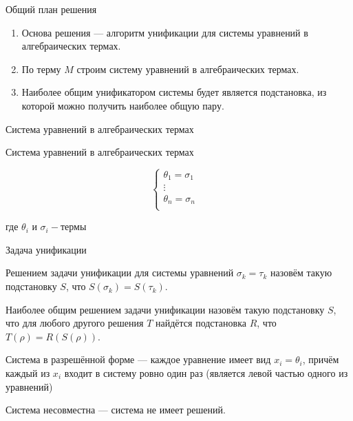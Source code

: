 \documentclass[aspectratio=169]{beamer}
\begin{document}
\begin{frame}{Общий план решения}
\begin{enumerate}
\item Основа решения --- алгоритм унификации для системы уравнений в алгебраических термах.
\item По терму $M$ строим систему уравнений в алгебраических термах.
\item Наиболее общим унификатором системы будет является подстановка, из которой можно получить наиболее общую пару.
\end{enumerate}
\end{frame}

\begin{frame}{Система уравнений в алгебраических термах}
	\begin{dfn}Система уравнений в алгебраических термах\end{dfn}
	$$
		\begin{cases}
			\theta_1=\sigma_1&\\
			\vdots&\\
			\theta_n=\sigma_n&\\
		\end{cases}
	$$\par где $\theta_i \text{ и } \sigma_i-\text{термы}$\par
\end{frame}

\begin{frame}{Задача унификации}

\begin{dfn}Решением задачи унификации для системы уравнений $\sigma_k = \tau_k$ назовём такую подстановку
$S$, что $S(\sigma_k) = S(\tau_k)$.
\end{dfn}
\begin{dfn}Наиболее общим решением задачи унификации назовём такую подстановку $S$, что для любого
другого решения $T$ найдётся подстановка $R$, что $T(\rho) = R(S(\rho))$.
\end{dfn}
\begin{dfn}Система в разрешённой форме --- каждое уравнение имеет вид $x_i = \theta_i$, причём
каждый из $x_i$ входит в систему ровно один раз (является левой частью одного из уравнений)
\end{dfn}
\begin{dfn}Система несовместна --- система не имеет решений.\end{dfn}
\end{frame}
\end{document}
